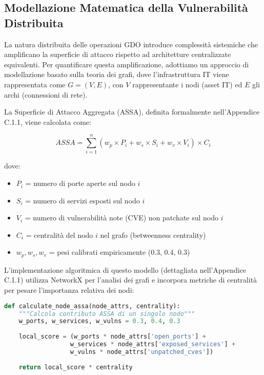 \subsection{Modellazione Matematica della Vulnerabilità Distribuita}

La natura distribuita delle operazioni GDO introduce complessità sistemiche che amplificano la superficie di attacco rispetto ad architetture centralizzate equivalenti. Per quantificare questa amplificazione, adottiamo un approccio di modellazione basato sulla teoria dei grafi, dove l'infrastruttura IT viene rappresentata come $G = (V, E)$, con $V$ rappresentante i nodi (asset IT) ed $E$ gli archi (connessioni di rete).

La Superficie di Attacco Aggregata (ASSA), definita formalmente nell'Appendice C.1.1, viene calcolata come:

\begin{equation}
ASSA = \sum_{i=1}^{n} (w_p \times P_i + w_s \times S_i + w_v \times V_i) \times C_i
\end{equation}

dove:
\begin{itemize}
    \item $P_i$ = numero di porte aperte sul nodo $i$
    \item $S_i$ = numero di servizi esposti sul nodo $i$
    \item $V_i$ = numero di vulnerabilità note (CVE) non patchate sul nodo $i$
    \item $C_i$ = centralità del nodo $i$ nel grafo (betweenness centrality)
    \item $w_p, w_s, w_v$ = pesi calibrati empiricamente (0.3, 0.4, 0.3)
\end{itemize}

L'implementazione algoritmica di questo modello (dettagliata nell'Appendice C.1.1) utilizza NetworkX per l'analisi dei grafi e incorpora metriche di centralità per pesare l'importanza relativa dei nodi:

\begin{lstlisting}[language=Python, caption=Calcolo semplificato ASSA per un nodo]
def calculate_node_assa(node_attrs, centrality):
    """Calcola contributo ASSA di un singolo nodo"""
    w_ports, w_services, w_vulns = 0.3, 0.4, 0.3
    
    local_score = (w_ports * node_attrs['open_ports'] + 
                  w_services * node_attrs['exposed_services'] + 
                  w_vulns * node_attrs['unpatched_cves'])
    
    return local_score * centrality
\end{lstlisting}

